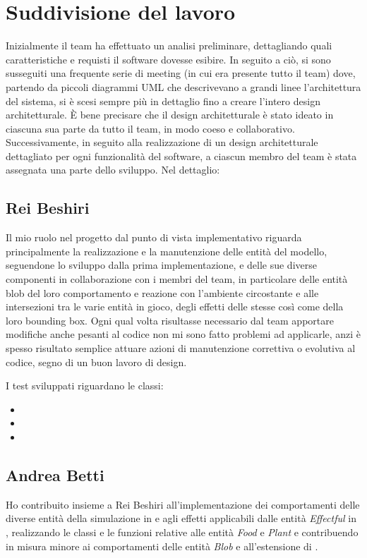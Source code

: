 \section{Suddivisione del lavoro}
Inizialmente il team ha effettuato un analisi preliminare, dettagliando quali caratteristiche e requisti il software dovesse esibire. In seguito a ciò, si sono susseguiti una frequente serie di meeting (in cui era presente tutto il team) dove, partendo da piccoli diagrammi UML che descrivevano a grandi linee l'architettura del sistema, si è scesi sempre più in dettaglio fino a creare l'intero design architetturale. È bene precisare che il design architetturale è stato ideato in ciascuna sua parte da tutto il team, in modo coeso e collaborativo. Successivamente, in seguito alla realizzazione di un design architetturale dettagliato per ogni funzionalità del software, a ciascun membro del team è stata assegnata una parte dello sviluppo. Nel dettaglio:

\subsection{Rei Beshiri}
Il mio ruolo nel progetto dal punto di vista implementativo riguarda principalmente la realizzazione e la manutenzione delle entità del modello, seguendone lo sviluppo dalla prima implementazione, e delle sue diverse componenti in collaborazione con i membri del team, in particolare delle entità blob del loro comportamento e reazione con l'ambiente circostante e alle intersezioni tra le varie entità in gioco, degli effetti delle stesse così come della loro bounding box.
Ogni qual volta risultasse necessario dal team apportare modifiche anche pesanti al codice non mi sono fatto problemi ad applicarle, anzi è spesso risultato semplice attuare azioni di manutenzione correttiva o evolutiva al codice, segno di un buon lavoro di design.

I test sviluppati riguardano le classi:
\begin{itemize}
    \item {}
    \item {}
    \item {}
\end{itemize}

\subsection{Andrea Betti}
Ho contribuito insieme a Rei Beshiri all'implementazione dei comportamenti delle diverse entità della simulazione in  e agli effetti applicabili dalle entità \textit{Effectful} in , realizzando le classi e le funzioni relative alle entità \textit{Food} e \textit{Plant} e contribuendo in misura minore ai comportamenti delle entità \textit{Blob} e all'estensione di .

